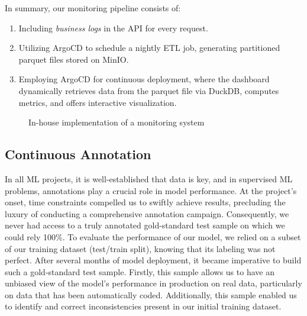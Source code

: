 In summary, our monitoring pipeline consists of:

\begin{enumerate}
    \item Including \textit{business logs} in the API for every request.
    \item Utilizing ArgoCD to schedule a nightly ETL job, generating partitioned parquet files stored on MinIO.
    \item Employing ArgoCD for continuous deployment, where the dashboard dynamically retrieves data from the parquet file via DuckDB, computes metrics, and offers interactive visualization.

\end{enumerate}

\begin{figure}[htbp]
    \centering
    \caption{In-house implementation of a monitoring system}
    \label{fig:monitoring-datalab}
\end{figure}


\subsection{Continuous Annotation}

In all ML projects, it is well-established that data is key, and in supervised ML problems, annotations play a crucial role in model performance. At the project's onset, time constraints compelled us to swiftly achieve results, precluding the luxury of conducting a comprehensive annotation campaign. Consequently, we never had access to a truly annotated gold-standard test sample on which we could rely 100\%. To evaluate the performance of our model, we relied on a subset of our training dataset (test/train split), knowing that its labeling was not perfect. After several months of model deployment, it became imperative to build such a gold-standard test sample. Firstly, this sample allows us to have an unbiased view of the model's performance in production on real data, particularly on data that has been automatically coded. Additionally, this sample enabled us to identify and correct inconsistencies present in our initial training dataset. 

